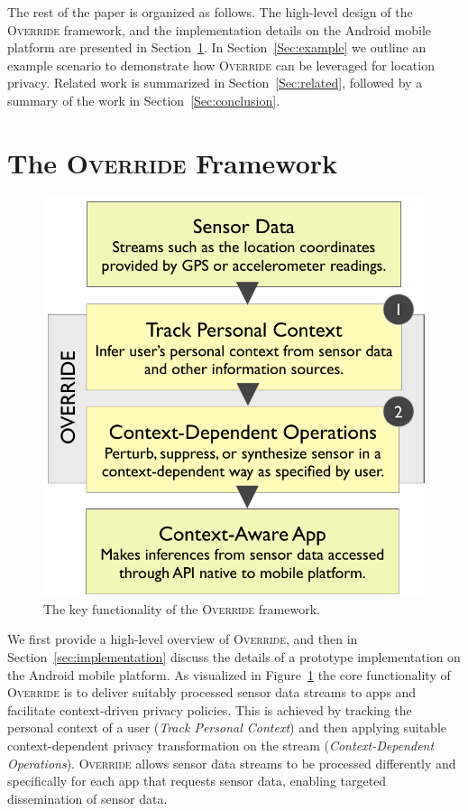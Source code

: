 \documentclass[10pt]{sensys-proc}
\begin{document}
The rest of the paper is organized as follows. The high-level design of the \textsc{Override} framework, and the implementation details on the Android mobile platform are presented in Section~\ref{Sec:architecture}. In Section~\ref{Sec:example} we outline an example scenario to demonstrate how \textsc{Override} can be leveraged for location privacy. Related work is summarized in Section~\ref{Sec:related}, followed by a summary of the work in Section~\ref{Sec:conclusion}.

\section{The \textsc{Override} Framework}
\label{Sec:architecture}
\begin{figure}
\includegraphics[width=\columnwidth]{../figures/flow5.pdf}
\caption{The key functionality of the \textsc{Override} framework.}
\label{fig:flow}
\end{figure}

We first provide a high-level overview of \textsc{Override}, and then in Section~\ref{sec:implementation} discuss the details of a prototype implementation on the Android mobile platform. As visualized in Figure~\ref{fig:flow} the core functionality of \textsc{Override} is to deliver suitably processed sensor data streams to apps and facilitate context-driven privacy policies. This is achieved by tracking the personal context of a user (\emph{Track Personal Context}) and then applying suitable context-dependent privacy transformation on the stream (\emph{Context-Dependent Operations}). \textsc{Override} allows sensor data streams to be processed differently and specifically for each app that requests sensor data, enabling targeted dissemination of sensor data.
\end{document}
